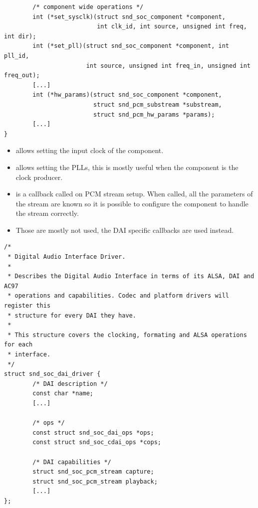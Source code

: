 \begin{frame}[fragile]{}
  \begin{block}{}
    \fontsize{9}{9}\selectfont
    \begin{verbatim}
        /* component wide operations */
        int (*set_sysclk)(struct snd_soc_component *component,
                          int clk_id, int source, unsigned int freq, int dir);
        int (*set_pll)(struct snd_soc_component *component, int pll_id,
                       int source, unsigned int freq_in, unsigned int freq_out);
        [...]
        int (*hw_params)(struct snd_soc_component *component,
                         struct snd_pcm_substream *substream,
                         struct snd_pcm_hw_params *params);
        [...]
}
    \end{verbatim}
  \end{block}
\end{frame}

\begin{frame}{}
  \begin{itemize}
  \item {} allows setting the input clock of the
    component.
  \item {} allows setting the PLLs, this is mostly useful
    when the component is the clock producer.
  \item {} is a callback called on PCM stream setup.
    When called, all the parameters of the stream are known so it is
    possible to configure the component to handle the stream
    correctly.
  \item Those are mostly not used, the DAI specific callbacks are used
    instead.
  \end{itemize}
\end{frame}

\begin{frame}[fragile]{}
  \begin{block}{}
    \fontsize{8}{8}\selectfont
    \begin{verbatim}
/*
 * Digital Audio Interface Driver.
 *
 * Describes the Digital Audio Interface in terms of its ALSA, DAI and AC97
 * operations and capabilities. Codec and platform drivers will register this
 * structure for every DAI they have.
 *
 * This structure covers the clocking, formating and ALSA operations for each
 * interface.
 */
struct snd_soc_dai_driver {
        /* DAI description */
        const char *name;
        [...]

        /* ops */
        const struct snd_soc_dai_ops *ops;
        const struct snd_soc_cdai_ops *cops;

        /* DAI capabilities */
        struct snd_soc_pcm_stream capture;
        struct snd_soc_pcm_stream playback;
        [...]
};
    \end{verbatim}
  \end{block}
\end{frame}

